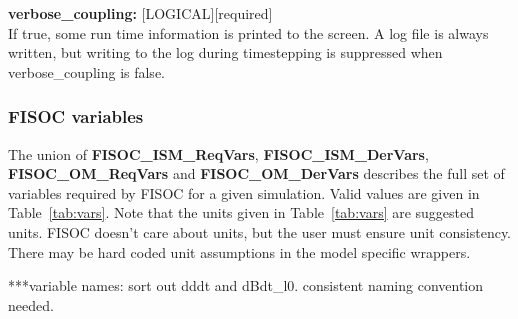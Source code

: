 \documentclass[12pt]{article}
\begin{document}
\begin{flushleft}
\textbf{verbose\_coupling:}  [LOGICAL][required]                           \\
If true, some run time information is printed to the screen.  A log file is always 
written, but writing to the log during timestepping is suppressed when 
verbose\_coupling is false.\\
\end{flushleft}



\subsubsection{FISOC variables}
\label{sec:FISOCvars}

The union of \textbf{FISOC\_ISM\_ReqVars}, \textbf{FISOC\_ISM\_DerVars}, \textbf{FISOC\_OM\_ReqVars} 
and \textbf{FISOC\_OM\_DerVars} describes the full set of variables required by FISOC for a given simulation. 
Valid values are given in Table~\ref{tab:vars}.
Note that the units given in Table~\ref{tab:vars} are suggested units.  FISOC doesn't care about units, but 
the user must ensure unit consistency.  There may be hard coded unit assumptions in the model specific 
wrappers.

***variable names: sort out dddt and dBdt\_l0.  consistent naming convention needed.
\end{document}
